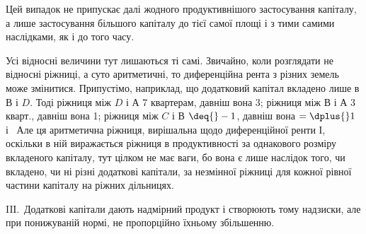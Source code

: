 
Цей випадок не припускає далі жодного продуктивнішого застосування
капіталу, а лише застосування більшого капіталу до тієї самої площі і з тими
самими наслідками, як і до того часу.

Усі відносні величини тут лишаються ті самі. Звичайно, коли розглядати
не відносні ріжниці, а суто аритметичні, то диференційна рента з різних земель може
змінитися. Припустімо, наприклад, що додатковий капітал вкладено лише
в $В$ і $D$. Тоді ріжниця між $D$ і $А$ \deq{} 7 квартерам, давніш вона \deq{} 3; ріжниця
між $В$ і $А$ \deq{} 3 кварт., давніш вона \deq{} 1; ріжниця між $C$ і В $\deq{} - 1$, давніш
вона $= \dplus{} 1$ і~ Але ця аритметична ріжниця, вирішальна щодо диференційної
ренти І, оскільки в ній виражається ріжниця в продуктивності за однакового
розміру вкладеного капіталу, тут цілком не має ваги, бо вона є лише
наслідок того, чи вкладено, чи ні різні додаткові капітали, за незмінної ріжниці
для кожної рівної частини капіталу на ріжних дільницях.

IIІ.~Додаткові капітали дають надмірний продукт і створюють тому надзиски,
але при понижуваній нормі, не пропорційно їхньому збільшенню.

